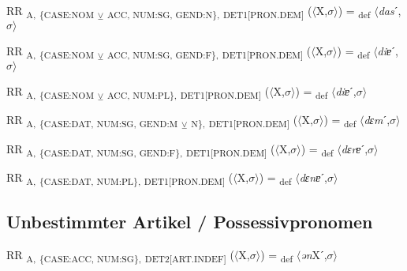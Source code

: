 {\begin{exe}
 RR \textsubscript{A,} \textsubscript{\{CASE:NOM} \textsubscript{${\veebar}$}\textsubscript{ ACC, NUM:SG, GEND:N\},} \textsubscript{DET1[PRON.DEM]} ($\langle$X,$\sigma $$\rangle$) = \textsubscript{def} $\langle$\textit{das}ˊ,$\sigma $$\rangle$
\end{exe}

\begin{exe}
 RR \textsubscript{A,} \textsubscript{\{CASE:NOM} \textsubscript{${\veebar}$}\textsubscript{ ACC, NUM:SG, GEND:F\},} \textsubscript{DET1[PRON.DEM]} ($\langle$X,$\sigma $$\rangle$) = \textsubscript{def} $\langle$\textit{diɐ}ˊ,$\sigma $$\rangle$
\end{exe}

\begin{exe}
 RR \textsubscript{A,} \textsubscript{\{CASE:NOM} \textsubscript{${\veebar}$}\textsubscript{ ACC, NUM:PL\},} \textsubscript{DET1[PRON.DEM]} ($\langle$X,$\sigma $$\rangle$) = \textsubscript{def} $\langle$\textit{diɐ}ˊ,$\sigma $$\rangle$
\end{exe}

\begin{exe}
 RR \textsubscript{A,} \textsubscript{\{CASE:DAT, NUM:SG, GEND:M} \textsubscript{${\veebar}$}\textsubscript{ N\},} \textsubscript{DET1[PRON.DEM]} ($\langle$X,$\sigma $$\rangle$) = \textsubscript{def} $\langle$\textit{dɛm}ˊ,$\sigma $$\rangle$
\end{exe}

\begin{exe}
 RR \textsubscript{A,} \textsubscript{\{CASE:DAT, NUM:SG, GEND:F\},} \textsubscript{DET1[PRON.DEM]} ($\langle$X,$\sigma $$\rangle$) = \textsubscript{def} $\langle$\textit{dɛrɐ}ˊ,$\sigma $$\rangle$
\end{exe}

\begin{exe}
 RR \textsubscript{A,} \textsubscript{\{CASE:DAT, NUM:PL\},} \textsubscript{DET1[PRON.DEM]} ($\langle$X,$\sigma $$\rangle$) = \textsubscript{def} $\langle$\textit{dɛnɐ}ˊ,$\sigma $$\rangle$
\end{exe}

\subsection{Unbestimmter Artikel / Possessivpronomen}

\begin{exe}
 RR \textsubscript{A,} \textsubscript{\{CASE:ACC, NUM:SG\},} \textsubscript{DET2[ART.INDEF]} ($\langle$X,$\sigma $$\rangle$) = \textsubscript{def} $\langle$\textit{ən}Xˊ,$\sigma $$\rangle$
\end{exe}

}
